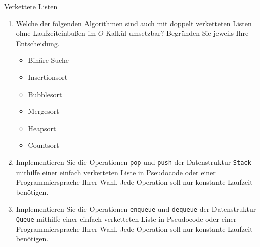 \documentclass[11pt,a4paper]{article}
\begin{document}
\begin{aufgabe}{4}{Verkettete Listen}
    \begin{enumerate}
        \item 
        Welche der folgenden Algorithmen sind auch mit doppelt verketteten Listen ohne Laufzeiteinbußen im $O$-Kalkül umsetzbar?
        Begründen Sie jeweils Ihre Entscheidung.
        \begin{itemize}
            \item Binäre Suche
            \item Insertionsort
            \item Bubblesort
            \item Mergesort
            \item Heapsort
            \item Countsort
        \end{itemize}
        \item Implementieren Sie die Operationen \texttt{pop} und \texttt{push} der Datenstruktur \texttt{Stack} mithilfe einer einfach verketteten Liste in Pseudocode oder einer Programmiersprache Ihrer Wahl.
        Jede Operation soll nur konstante Laufzeit benötigen.
        \item Implementieren Sie die Operationen \texttt{enqueue} und \texttt{dequeue} der Datenstruktur \texttt{Queue} mithilfe einer einfach verketteten Liste in Pseudocode oder einer Programmiersprache Ihrer Wahl.
        Jede Operation soll nur konstante Laufzeit benötigen.
    \end{enumerate}
\end{aufgabe}
\end{document}
